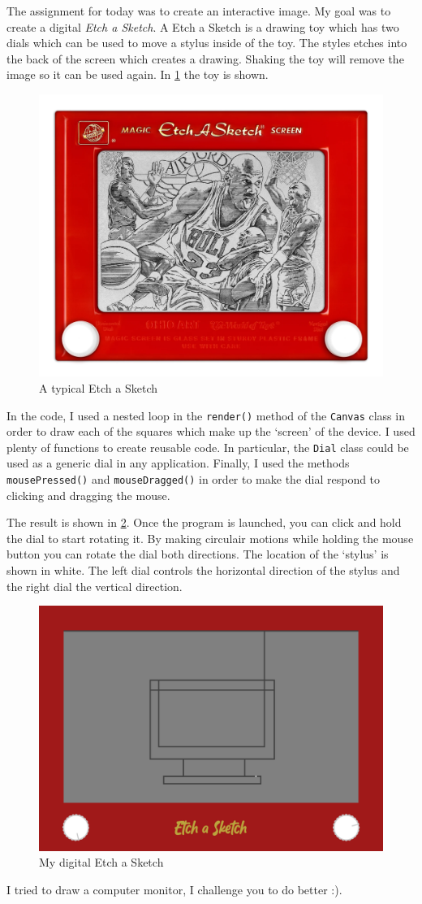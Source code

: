 The assignment for today was to create an interactive image. My goal was to create a digital \textit{Etch a Sketch}. A Etch a Sketch is a drawing toy which has two dials which can be used to move a stylus inside of the toy. The styles etches into the back of the screen which creates a drawing. Shaking the toy will remove the image so it can be used again. In \cref{fig: etch a sketch} the toy is shown.

\begin{figure}[H]
    \centering
    \includegraphics[width = 0.35 \textwidth]{Figures/day_4/etch_a_sketch.png}
    \caption{A typical Etch a Sketch}
    \label{fig: etch a sketch}
\end{figure}

In the code, I used a nested loop in the \texttt{render()} method of the \texttt{Canvas} class in order to draw each of the squares which make up the `screen' of the device. I used plenty of functions to create reusable code. In particular, the \texttt{Dial} class could be used as a generic dial in any application. Finally, I used the methods \texttt{mousePressed()} and \texttt{mouseDragged()} in order to make the dial respond to clicking and dragging the mouse.

\medskip

The result is shown in \cref{fig: my etch a sketch}. Once the program is launched, you can click and hold the dial to start rotating it. By making circulair motions while holding the mouse button you can rotate the dial both directions. The location of the `stylus' is shown in white. The left dial controls the horizontal direction of the stylus and the right dial the vertical direction.

\begin{figure}[H]
    \centering
    \includegraphics[width = 0.3 \textwidth]{Figures/day_4/my_etch_a_sketch.png}
    \caption{My digital Etch a Sketch}
    \label{fig: my etch a sketch}
\end{figure}

I tried to draw a computer monitor, I challenge you to do better :).